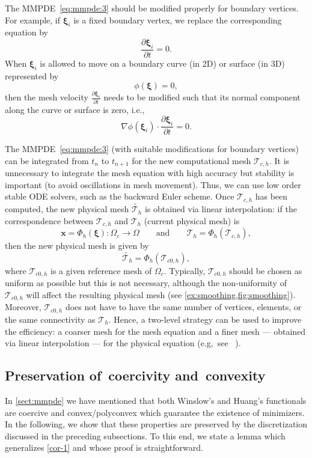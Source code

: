 \documentclass[american]{scrartcl}
\providecommand{\acite}[1]{\citeauthor{#1}~\cite{#1}}
\providecommand{\V}[1]{\boldsymbol{#1}}
\providecommand{\p}[2]{\frac{\partial{}#1}{\partial{}#2}}
\providecommand{\Th}{\mathcal{T}_h}
\providecommand{\Thc}{\mathcal{T}_{c,h}}
\providecommand{\ThcO}{\mathcal{T}_{c0, h}}
\theoremstyle{remark}
\begin{document}
The MMPDE~\cref{eq:mmpde:3} should be modified properly for boundary vertices.
For example, if $\V{\xi}_i$ is a fixed boundary vertex, we replace the corresponding equation by
\begin{equation}
   \p{\V{\xi}_i}{t} = 0.
   \label{eq:fixed-bc}
\end{equation}
When $\V{\xi}_i$ is allowed to move on a boundary curve (in 2D) or surface (in 3D) represented by
\[
   \phi(\V{\xi}) = 0,
\]
then the mesh velocity $\p{\V{\xi}_i}{t}$ needs to be modified such that its normal component along the curve or surface is zero, i.e.,
\[
   \nabla \phi (\V{\xi}_i) \cdot \p{\V{\xi}_i}{t} = 0.
\]

The MMPDE~\cref{eq:mmpde:3} (with suitable modifications for boundary vertices) can be integrated from $t_n$ to $t_{n+1}$ for the new computational mesh $\Thc$.
It is unnecessary to integrate the mesh equation with high accuracy but stability is important (to avoid oscillations in mesh movement).
Thus, we can use low order stable ODE solvers, such as the backward Euler scheme.
Once $\Thc$ has been computed, the new physical mesh $\widetilde{\Th}$ is obtained via linear interpolation: if the correspondence between $\Thc$ and $\Th$ (current physical mesh) is
\[
   \V{x} = \Phi_h(\V{\xi})\colon \Omega_c \to \Omega
   \qquad \text{and} \qquad
   \Th = \Phi_h(\Thc)
   ,
\]
then the new physical mesh is given by
\[
   \widetilde{\Th} = \Phi_h(\ThcO),
\]
where $\ThcO$ is a given reference mesh of $\Omega_c$.
Typically, $\ThcO$ should be chosen as uniform as possible but this is not necessary, although the non-uniformity of $\ThcO$ will affect the resulting physical mesh (see \cref{ex:smoothing,fig:smoothing}). 
Moreover, $\ThcO$ does not have to have the same number of vertices, elements, or the same connectivity as $\Th$.
Hence, a two-level strategy can be used to improve the efficiency: a coarser mesh for the mesh equation and a finer mesh --- obtained via linear interpolation --- for the physical equation (e.g,\ see \acite{Hua01}).

\subsection{Preservation of~coercivity and~convexity}
\label{sect:preservation}

In \cref{sect:mmpde} we have mentioned that both Winslow's and Huang's functionals are coercive and convex/polyconvex which guarantee the existence of minimizers.
In the following, we show that these properties are preserved by the discretization discussed in the preceding subsections.
To this end, we state a lemma which generalizes \cref{cor-1} and whose proof is straightforward.
\end{document}
